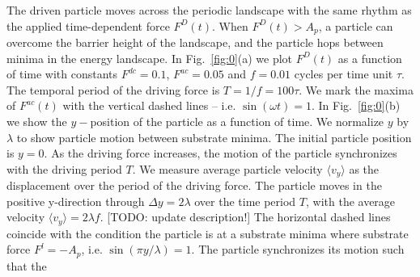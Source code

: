 \documentclass[twocolumn,preprintnumbers,amsmath,amssymb,aps,prx]{revtex4}
\begin{document}
The driven particle %
moves across %
the periodic landscape with the same rhythm as 
the applied time-dependent force $F^D(t)$.
When $F^D(t) > A_p$, a particle can 
overcome the barrier height of the landscape,
and 
the particle hops between minima in the energy landscape.
%
In Fig.~\ref{fig:0}(a)
we plot $F^D(t)$ %
as a function of time with
constants $F^{dc}=0.1$, 
$F^{ac}=0.05$ and $f=0.01$ cycles per time unit $\tau$.
The temporal period of the driving force is
$T = 1/f = 100 \tau$.
We mark the maxima of $F^{ac}(t)$
with the
vertical dashed lines %
-- i.e. $\sin{(\omega t)} = 1$.
%
%
%
In Fig.~\ref{fig:0}(b) 
we show the $y-$position of the particle
as a function of time.
We 
normalize $y$ by $\lambda$ %
to show  particle motion between substrate minima.  
The initial particle position is $y = 0 $. %
As the driving force increases,
the motion of the particle
synchronizes with the driving period $T$.
We measure 
average particle velocity $\langle{v}_y\rangle$
as the displacement %
over the period of the driving force.
The particle moves
in the positive y-direction
through $\Delta y = 2 \lambda$ over the time period $T$,
with 
the average velocity 
$\langle {v}_y \rangle= 2 \lambda f$. %
[TODO: update description!]
The horizontal dashed lines
coincide with the condition the particle is at a substrate minima
where substrate force  $F^l = -A_p$,  
i.e. $\sin{(\pi y / \lambda)} = 1$.
The particle synchronizes its motion such that the 
\end{document}
